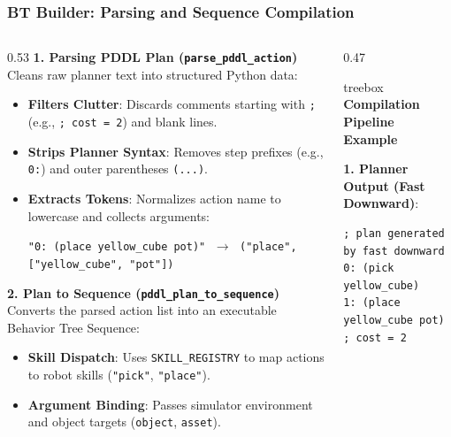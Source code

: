 \documentclass[10pt]{beamer}
\begin{document}
\begin{frame}[fragile]
\frametitle{BT Builder: Parsing and Sequence Compilation}
\begin{columns}[T]
    \begin{column}{0.53\textwidth}
        \small \textbf{1. Parsing PDDL Plan (\texttt{parse\_pddl\_action})}
        \scriptsize
        Cleans raw planner text into structured Python data:
        \begin{itemize}
            \item \textbf{Filters Clutter}: Discards comments starting with \texttt{;} (e.g., \texttt{; cost = 2}) and blank lines.
            \item \textbf{Strips Planner Syntax}: Removes step prefixes (e.g., \texttt{0:}) and outer parentheses \texttt{(...)}.
            \item \textbf{Extracts Tokens}: Normalizes action name to lowercase and collects arguments:
            \begin{center}
                \tiny \texttt{"0: (place yellow\_cube pot)"} $\;\longrightarrow\;$ \texttt{("place", ["yellow\_cube", "pot"])}
            \end{center}
        \end{itemize}

        \vspace{0.15cm}
        \small \textbf{2. Plan to Sequence (\texttt{pddl\_plan\_to\_sequence})}
        \scriptsize
        Converts the parsed action list into an executable Behavior Tree Sequence:
        \begin{itemize}
            \item \textbf{Skill Dispatch}: Uses \texttt{SKILL\_REGISTRY} to map actions to robot skills (\texttt{"pick"}, \texttt{"place"}).
            \item \textbf{Argument Binding}: Passes simulator environment and object targets (\texttt{object}, \texttt{asset}).
        \end{itemize}
    \end{column}

    \begin{column}{0.47\textwidth}
        \begin{beamercolorbox}[sep=5pt,rounded=true,shadow=true]{treebox}
            \scriptsize \textbf{Compilation Pipeline Example}
            \vspace{0.1cm}

            \tiny \textbf{1. Planner Output (Fast Downward)}:
            \begin{verbatim}
; plan generated by fast downward
0: (pick yellow_cube)
1: (place yellow_cube pot)
; cost = 2
            \end{verbatim}


\end{beamercolorbox}
\end{column}
\end{columns}
\end{frame}
\end{document}
